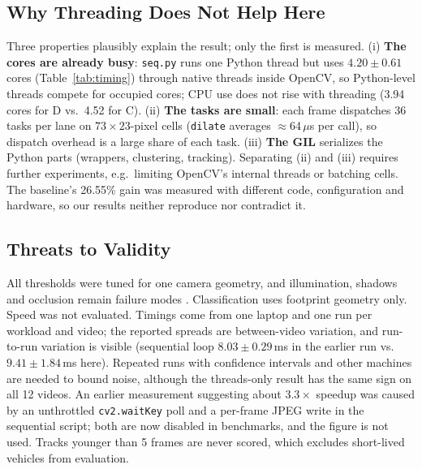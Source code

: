 \documentclass[conference]{IEEEtran}
\newcommand{\code}[1]{\texttt{#1}}
\begin{document}
\subsection{Why Threading Does Not Help Here}
\label{sec:why}
Three properties plausibly explain the result; only the first is
measured. (i) \textbf{The cores are already busy}: \code{seq.py} runs one
Python thread but uses $4.20\pm0.61$ cores (Table~\ref{tab:timing})
through native threads inside OpenCV, so Python-level threads compete
for occupied cores; CPU use does not rise with threading (3.94 cores for
D vs.\ 4.52 for C). (ii) \textbf{The tasks are small}: each frame
dispatches 36 tasks per lane on $73\times23$-pixel cells (\code{dilate}
averages $\approx$64\,$\mu$s per call), so dispatch overhead is a large
share of each task. (iii) \textbf{The GIL} serializes the Python parts
(wrappers, clustering, tracking). Separating (ii) and (iii) requires
further experiments, e.g.\ limiting OpenCV's internal threads or
batching cells. The baseline's 26.55\% gain \cite{baseline} was measured
with different code, configuration and hardware, so our results neither
reproduce nor contradict it.

\subsection{Threats to Validity}
\label{sec:threats}
All thresholds were tuned for one camera geometry, and illumination,
shadows and occlusion remain failure modes \cite{abbas2021,chen2020}.
Classification uses footprint geometry only. Speed was not evaluated.
Timings come from one laptop and one run per workload and video; the
reported spreads are between-video variation, and run-to-run variation is
visible (sequential loop $8.03\pm0.29$\,ms in the earlier run vs.\
$9.41\pm1.84$\,ms here). Repeated runs with confidence intervals
\cite{kalibera2013} and other machines are needed to bound noise, although
the threads-only result has the same sign on all 12 videos. An earlier
measurement suggesting about $3.3\times$ speedup was caused by an
unthrottled \code{cv2.waitKey} poll and a per-frame JPEG write in the
sequential script; both are now disabled in benchmarks, and the figure is
not used. Tracks younger than 5 frames are never scored, which excludes
short-lived vehicles from evaluation.
\end{document}
